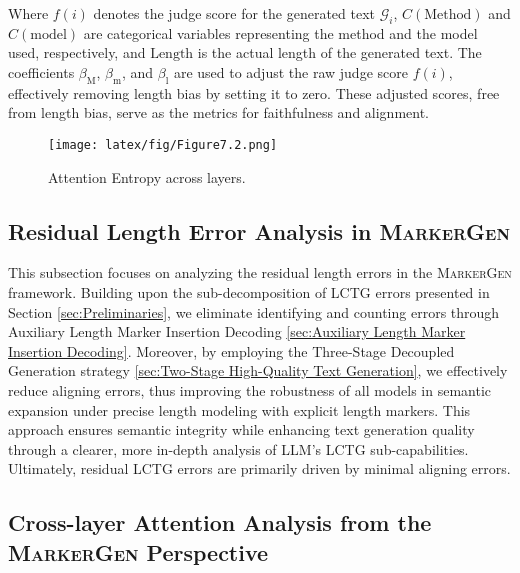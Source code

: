 Where \( f(i) \) denotes the judge score for the generated text \( \mathcal{G}_{i} \), \( C(\text{Method}) \) and \( C(\text{model}) \) are categorical variables representing the method and the model used, respectively, and \( \text{Length} \) is the actual length of the generated text. The coefficients \( \beta_{\text{M}} \), \( \beta_{\text{m}} \), and \( \beta_{\text{l}} \) are used to adjust the raw judge score \( f(i) \), effectively removing length bias by setting it to zero. These adjusted scores, free from length bias, serve as the metrics for faithfulness and alignment.





\begin{figure*}[t]
\centering
  \texttt{[image: latex/fig/Figure7.2.png]}
  \caption{Attention Entropy across layers.}
  \vspace{-0.5cm} %
  \label{fig:Figure11}
\end{figure*}


\subsection{Residual Length Error Analysis in \textsc{MarkerGen}}

This subsection focuses on analyzing the residual length errors in the \textsc{MarkerGen} framework. Building upon the sub-decomposition of LCTG errors presented in Section \ref{sec:Preliminaries}, we eliminate identifying and counting errors through Auxiliary Length Marker Insertion Decoding \ref{sec:Auxiliary Length Marker Insertion Decoding}. Moreover, by employing the Three-Stage Decoupled Generation strategy \ref{sec:Two-Stage High-Quality Text Generation}, we effectively reduce aligning errors, thus improving the robustness of all models in semantic expansion under precise length modeling with explicit length markers. This approach ensures semantic integrity while enhancing text generation quality through a clearer, more in-depth analysis of LLM’s LCTG sub-capabilities. Ultimately, residual LCTG errors are primarily driven by minimal aligning errors.





\subsection{Cross-layer Attention Analysis from the \textsc{MarkerGen} Perspective}

